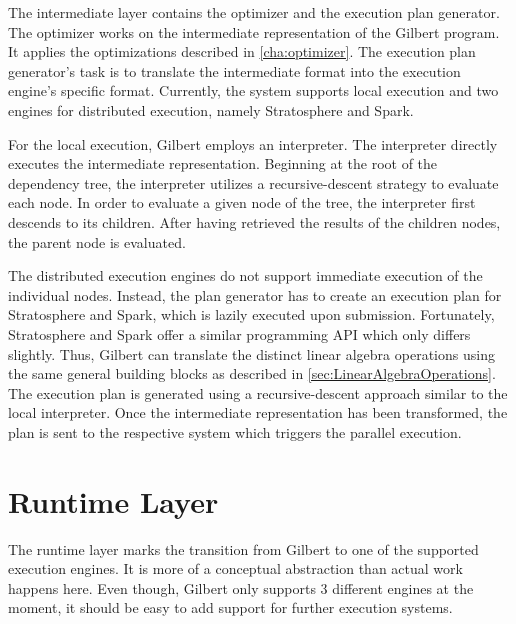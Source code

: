 The intermediate layer contains the optimizer and the execution plan generator.
The optimizer works on the intermediate representation of the Gilbert program.
It applies the optimizations described in \cref{cha:optimizer}.
The execution plan generator's task is to translate the intermediate format into the execution engine's specific format.
Currently, the system supports local execution and two engines for distributed execution, namely Stratosphere and Spark.

For the local execution, Gilbert employs an interpreter.
The interpreter directly executes the intermediate representation.
Beginning at the root of the dependency tree, the interpreter utilizes a recursive-descent strategy to evaluate each node.
In order to evaluate a given node of the tree, the interpreter first descends to its children.
After having retrieved the results of the children nodes, the parent node is evaluated.

The distributed execution engines do not support immediate execution of the individual nodes.
Instead, the plan generator has to create an execution plan for Stratosphere and Spark, which is lazily executed upon submission.
Fortunately, Stratosphere and Spark offer a similar programming API which only differs slightly.
Thus, Gilbert can translate the distinct linear algebra operations using the same general building blocks as described in \cref{sec:LinearAlgebraOperations}.
The execution plan is generated using a recursive-descent approach similar to the local interpreter.
Once the intermediate representation has been transformed, the plan is sent to the respective system which triggers the parallel execution.

\section{Runtime Layer}

The runtime layer marks the transition from Gilbert to one of the supported execution engines.
It is more of a conceptual abstraction than actual work happens here.
Even though, Gilbert only supports 3 different engines at the moment, it should be easy to add support for further execution systems.

